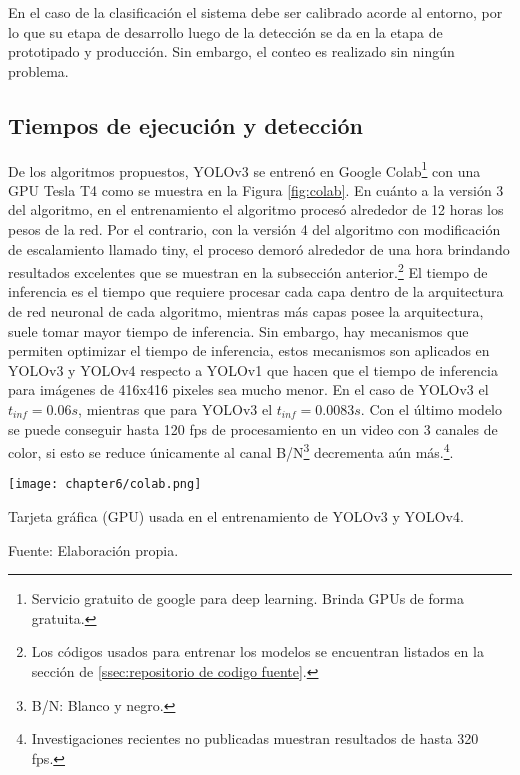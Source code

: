 En el caso de la clasificación el sistema debe ser calibrado acorde al entorno, por lo que su etapa de desarrollo luego de la detección se da en la etapa de prototipado y producción. Sin embargo, el conteo es realizado sin ningún problema.


\subsection{Tiempos de ejecución y detección}

De los algoritmos propuestos, YOLOv3 se entrenó en Google Colab\footnote{Servicio gratuito de google para deep learning. Brinda GPUs de forma gratuita.} con una GPU Tesla T4 como se muestra en la Figura \ref{fig:colab}. En cuánto a la versión 3 del algoritmo, en el entrenamiento el algoritmo procesó alrededor de 12 horas los pesos de la red. Por el contrario, con la versión 4 del algoritmo con modificación de escalamiento llamado tiny, el proceso demoró alrededor de una hora brindando resultados excelentes que se muestran en la subsección anterior.\footnote{Los códigos usados para entrenar los modelos se encuentran listados en la sección de \ref{ssec:repositorio de codigo fuente}.} El tiempo de inferencia es el tiempo que requiere procesar cada capa dentro de la arquitectura de red neuronal de cada algoritmo, mientras más capas posee la arquitectura, suele tomar mayor tiempo de inferencia. Sin embargo, hay mecanismos que permiten optimizar el tiempo de inferencia, estos mecanismos son aplicados en YOLOv3 y YOLOv4 respecto a YOLOv1 que hacen que el tiempo de inferencia para imágenes de 416x416 pixeles sea mucho menor. En el caso de YOLOv3 el $t_{inf}=0.06 s$, mientras que para YOLOv3 el $t_{inf}=0.0083 s$. Con el último modelo se puede conseguir hasta 120 fps de procesamiento en un video con 3 canales de color, si esto se reduce únicamente al canal B/N\footnote{B/N: Blanco y negro.} decrementa aún más.\footnote{Investigaciones recientes no publicadas muestran resultados de hasta 320 fps.}.

\begin{myfigure}[H]
	\footnotesize\centering
	\texttt{[image: chapter6/colab.png]}
	\caption{Tarjeta gráfica (GPU) usada en el entrenamiento de YOLOv3 y YOLOv4.}
	\begin{myflushcenter}
		Fuente: Elaboración propia.
	\end{myflushcenter}
	\label{fig:colab}
\end{myfigure}

